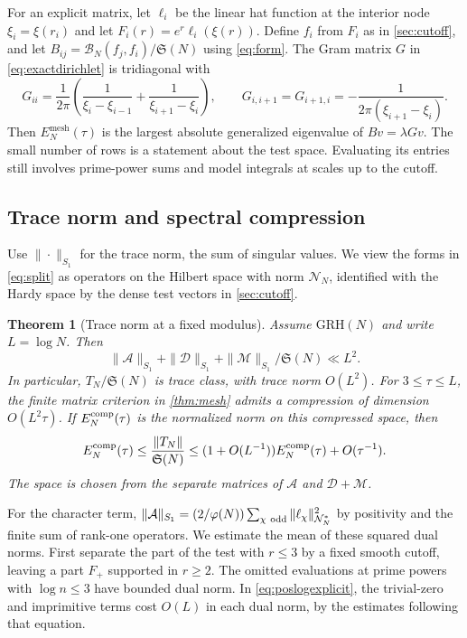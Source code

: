 \documentclass[11pt,a4paper]{article}
\numberwithin{equation}{section}
\newtheorem{theorem}{Theorem}[section]
\newcommand{\SSS}{\mathfrak S}
\newcommand{\grh}{\mathrm{GRH}}
\newcommand{\B}{\mathcal B_N}
\newcommand{\NN}{\mathcal N_N}
\begin{document}
For an explicit matrix, let $\ell_i$ be the linear hat function at
the interior node $\xi_i=\xi(r_i)$ and let
$F_i(r)=e^r\ell_i(\xi(r))$. Define $f_i$ from $F_i$ as in
\cref{sec:cutoff}, and let
$B_{ij}=\B(f_j,f_i)/\SSS(N)$ using \cref{eq:form}.
The Gram matrix $G$ in \cref{eq:exactdirichlet} is tridiagonal with
\[
 G_{ii}=\frac{1}{2\pi}
       \left(\frac{1}{\xi_i-\xi_{i-1}}
                  +\frac{1}{\xi_{i+1}-\xi_i}\right),
 \qquad
 G_{i,i+1}=G_{i+1,i}=-\frac{1}{2\pi(\xi_{i+1}-\xi_i)}.
\]
Then $E_N^{\mathrm{mesh}}(\tau)$ is the largest absolute
generalized eigenvalue of $Bv=\lambda Gv$. The small number of
rows is a statement about the test space. Evaluating its entries
still involves prime-power sums and model integrals at scales up
to the cutoff.

\subsection{Trace norm and spectral compression}

Use $\|\cdot\|_{S_1}$ for the trace norm, the sum of singular
values. We view the forms in \cref{eq:split} as operators on
the Hilbert space with norm $\NN$, identified with the Hardy
space by the dense test vectors in \cref{sec:cutoff}.

\begin{theorem}[Trace norm at a fixed modulus]
\label{thm:tracecompression}
Assume $\grh(N)$ and write $L=\log N$. Then
\begin{equation}
 \|\mathcal A\|_{S_1}+\|\mathcal D\|_{S_1}
       +\|\mathcal M\|_{S_1}/\SSS(N)\ll L^2.
 \label{eq:traceterms}
\end{equation}
In particular, $T_N/\SSS(N)$ is trace class, with trace norm
$O(L^2)$. For $3\le\tau\le L$, the finite matrix criterion
in \cref{thm:mesh} admits a compression of dimension
$O(L^2\tau)$. If $E_N^{\rm comp}(\tau)$ is the normalized
norm on this compressed space, then
\begin{equation}
 E_N^{\rm comp}(\tau)\le \frac{\|T_N\|}{\SSS(N)}
  \le (1+O(L^{-1}))E_N^{\rm comp}(\tau)+O(\tau^{-1}).
 \label{eq:compressedmesh}
\end{equation}
The space is chosen from the separate matrices of
$\mathcal A$ and $\mathcal D+\mathcal M$.
\end{theorem}

For the character term,
$\|\mathcal A\|_{S_1}= (2/\varphi(N))\sum_{\chi\ {\rm odd}}
\|\ell_\chi\|_{\NN^*}^2$ by positivity and the finite sum
of rank-one operators. We estimate the mean of these
squared dual norms. First separate the part of the test
with $r\le3$ by a fixed smooth cutoff, leaving a part
$F_+$ supported in $r\ge2$. The omitted evaluations at
prime powers with $\log n\le3$ have bounded dual norm.
In \cref{eq:poslogexplicit}, the trivial-zero and
imprimitive terms cost $O(L)$ in each dual norm, by
the estimates following that equation.
\end{document}
